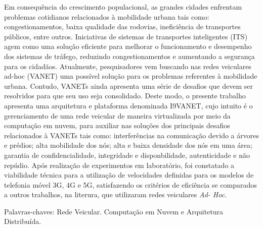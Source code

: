 \documentclass[
	12pt,				%
	oneside,			%
	a4paper,			%
	english,			%
	brazil				%
	]{abntex2ppgsi}
\begin{document}
\begin{resumo}
Em consequência do crescimento populacional, as grandes cidades enfrentam problemas cotidianos relacionados à mobilidade urbana tais como: congestionamentos, baixa qualidade das rodovias, ineficiência de transportes públicos, entre outros. Iniciativas de sistemas de transportes inteligentes (ITS) agem como uma solução eficiente para melhorar o funcionamento e desempenho dos sistemas de tráfego, reduzindo congestionamentos e aumentando a segurança para os cidadãos. Atualmente, pesquisadores vem buscando nas redes veiculares ad-hoc (VANET) uma possível solução para os problemas referentes à mobilidade urbana. Contudo, VANETs ainda apresenta uma série de desafios que devem ser resolvidos para que seu uso seja consolidado.  Deste modo, o presente trabalho apresenta uma arquitetura e plataforma denominada I9VANET, cujo intuito é o gerenciamento de uma rede veicular de maneira virtualizada por meio da computação em nuvem, para auxiliar nas soluções dos principais desafios relacionados à VANETs tais como: interferências na comunicação devido a árvores e prédios;  alta mobilidade dos nós; alta e baixa densidade dos nós em uma área; garantia de confidencialidade, integridade e disponbilidade, autenticidade e não repúdio. Após realização de experimentos em laboratório, foi constatado a viabilidade técnica para a utilização de velocidades definidas para os modelos de telefonia móvel 3G, 4G e 5G, satisfazendo os critérios de eficiência se comparados a outros trabalhos, na literura, que utilizaram redes veiculares \textit{Ad- Hoc}.
 
Palavras-chaves: Rede Veicular. Computação em Nuvem e Arquitetura Distribuída.

\end{resumo}
\end{document}
